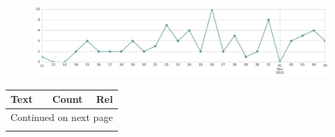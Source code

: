 \begin{figure}[htbp!]
    \centering
    \includegraphics[width=\textwidth]{twitter_all/report_images/topic-02-timeseries.jpg}
\end{figure}

\begin{longtable}{p{12.5cm}rr}
\toprule
Text & Count & Rel \\
\midrule
\endhead
\midrule
\multicolumn{3}{r}{{Continued on next page}} \\
\midrule
\endfoot


\end{longtable}
